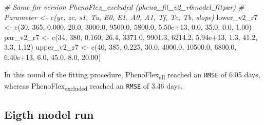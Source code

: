 \documentclass[
]{article}
\newenvironment{Shaded}{\begin{snugshade}}{\end{snugshade}}
\newcommand{\CommentTok}[1]{\textcolor[rgb]{0.56,0.35,0.01}{\textit{#1}}}
\newcommand{\DecValTok}[1]{\textcolor[rgb]{0.00,0.00,0.81}{#1}}
\newcommand{\FloatTok}[1]{\textcolor[rgb]{0.00,0.00,0.81}{#1}}
\newcommand{\FunctionTok}[1]{\textcolor[rgb]{0.00,0.00,0.00}{#1}}
\newcommand{\NormalTok}[1]{#1}
\newcommand{\OtherTok}[1]{\textcolor[rgb]{0.56,0.35,0.01}{#1}}
\begin{document}
\begin{Shaded}
\begin{Highlighting}[]
\CommentTok{\# Same for version PhenoFlex\_excluded (pheno\_fit\_v2\_r6$model\_fit$par)}
\CommentTok{\# Parameter \textless{}{-} c(yc,  zc,   s1,   Tu,     E0,      E1,     A0,       A1,   Tf,   Tc,   Tb, slope)}
\NormalTok{lower\_v2\_r7 }\OtherTok{\textless{}{-}} \FunctionTok{c}\NormalTok{(}\DecValTok{30}\NormalTok{, }\DecValTok{365}\NormalTok{, }\FloatTok{0.000}\NormalTok{, }\FloatTok{20.0}\NormalTok{, }\FloatTok{3000.0}\NormalTok{,  }\FloatTok{9500.0}\NormalTok{, }\FloatTok{5800.0}\NormalTok{, }\FloatTok{5.50e+13}\NormalTok{,  }\FloatTok{0.0}\NormalTok{, }\FloatTok{35.0}\NormalTok{,  }\FloatTok{0.0}\NormalTok{,  }\FloatTok{1.00}\NormalTok{)}
\NormalTok{par\_v2\_r7   }\OtherTok{\textless{}{-}} \FunctionTok{c}\NormalTok{(}\DecValTok{34}\NormalTok{, }\DecValTok{380}\NormalTok{, }\FloatTok{0.160}\NormalTok{, }\FloatTok{26.4}\NormalTok{, }\FloatTok{3371.0}\NormalTok{,  }\FloatTok{9901.3}\NormalTok{, }\FloatTok{6214.2}\NormalTok{, }\FloatTok{5.94e+13}\NormalTok{,  }\FloatTok{1.3}\NormalTok{, }\FloatTok{41.2}\NormalTok{,  }\FloatTok{3.3}\NormalTok{,  }\FloatTok{1.12}\NormalTok{)}
\NormalTok{upper\_v2\_r7 }\OtherTok{\textless{}{-}} \FunctionTok{c}\NormalTok{(}\DecValTok{40}\NormalTok{, }\DecValTok{385}\NormalTok{, }\FloatTok{0.225}\NormalTok{, }\FloatTok{30.0}\NormalTok{, }\FloatTok{4000.0}\NormalTok{, }\FloatTok{10500.0}\NormalTok{, }\FloatTok{6800.0}\NormalTok{, }\FloatTok{6.40e+13}\NormalTok{,  }\FloatTok{6.0}\NormalTok{, }\FloatTok{45.0}\NormalTok{,  }\FloatTok{8.0}\NormalTok{, }\FloatTok{20.00}\NormalTok{)}
\end{Highlighting}
\end{Shaded}

In this round of the fitting procedure, PhenoFlex\textsubscript{all}
reached an \texttt{RMSE} of 6.05 days, whereas
PhenoFlex\textsubscript{excluded} reached an \texttt{RMSE} of 3.46 days.

\hypertarget{eigth-model-run}{%
\subsection{Eigth model run}\label{eigth-model-run}}
\end{document}
